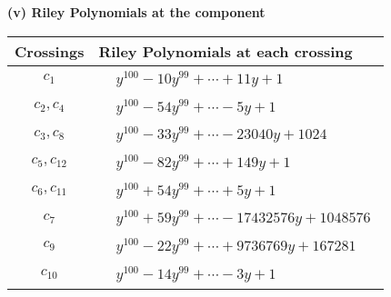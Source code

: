 \documentclass[1p]{elsarticle_modified}
\theoremstyle{definition}
\begin{document}
\newpage\renewcommand{\arraystretch}{1}
\flushleft \textbf{(v) Riley Polynomials at the component}\newline \\
\begin{tabular}{m{50pt}|m{274pt}}
Crossings & \hspace{64pt}Riley Polynomials at each crossing \\
\hline $$\begin{aligned}c_{1}\end{aligned}$$&$\begin{aligned}
&y^{100}-10 y^{99}+\cdots+11 y+1
\end{aligned}$\\
\hline $$\begin{aligned}c_{2},c_{4}\end{aligned}$$&$\begin{aligned}
&y^{100}-54 y^{99}+\cdots-5 y+1
\end{aligned}$\\
\hline $$\begin{aligned}c_{3},c_{8}\end{aligned}$$&$\begin{aligned}
&y^{100}-33 y^{99}+\cdots-23040 y+1024
\end{aligned}$\\
\hline $$\begin{aligned}c_{5},c_{12}\end{aligned}$$&$\begin{aligned}
&y^{100}-82 y^{99}+\cdots+149 y+1
\end{aligned}$\\
\hline $$\begin{aligned}c_{6},c_{11}\end{aligned}$$&$\begin{aligned}
&y^{100}+54 y^{99}+\cdots+5 y+1
\end{aligned}$\\
\hline $$\begin{aligned}c_{7}\end{aligned}$$&$\begin{aligned}
&y^{100}+59 y^{99}+\cdots-17432576 y+1048576
\end{aligned}$\\
\hline $$\begin{aligned}c_{9}\end{aligned}$$&$\begin{aligned}
&y^{100}-22 y^{99}+\cdots+9736769 y+167281
\end{aligned}$\\
\hline $$\begin{aligned}c_{10}\end{aligned}$$&$\begin{aligned}
&y^{100}-14 y^{99}+\cdots-3 y+1
\end{aligned}$\\
\hline
\end{tabular}\\~\\
\end{document}
